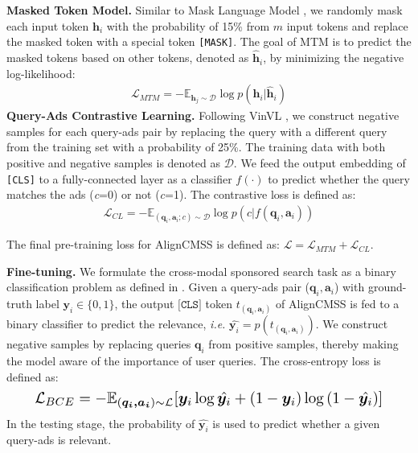 \documentclass[letterpaper]{article} \usepackage{aaai24}  \usepackage{times}  \usepackage{helvet}  \usepackage{courier}  \usepackage[hyphens]{url}  \usepackage{graphicx} \urlstyle{rm} \def\UrlFont{\rm}  \usepackage{natbib}  \usepackage{caption} \frenchspacing  \setlength{\pdfpagewidth}{8.5in}  \setlength{\pdfpageheight}{11in}
\begin{document}
\noindent\textbf{Masked Token Model.} Similar to Mask Language Model \cite{devlin2019bert}, we randomly mask each input token $\boldsymbol{h}_i$ with the probability of 15\% from $m$ input tokens and replace the masked token with a special token \texttt{[MASK]}. 
The goal of MTM is to predict the masked tokens based on other tokens, denoted as $\hat{\boldsymbol{h}}_i$, by minimizing the negative log-likelihood:
\begin{equation}
\begin{aligned}
\mathcal{L}_{MTM} = -\mathbb{E}_{ \boldsymbol{h}_j\sim{\mathcal{D}}}\log{p(\boldsymbol{h}_i|{{\hat{\boldsymbol{h}}_i}})}
\label{f:6}
\end{aligned}
\end{equation}
\noindent\textbf{Query-Ads Contrastive Learning.} Following VinVL \cite{zhang2021vinvl}, we construct negative samples for each query-ads pair by replacing the query with a different query from the training set with a probability of 25\%. The training data with both positive and negative samples is denoted as $\mathcal{D}$. We feed the output embedding of \texttt{[CLS]} to a fully-connected layer as a classifier $f(\cdot)$ to predict whether the query matches the ads (\textit{c}=0) or not (\textit{c}=1). The contrastive loss is defined as:
\begin{equation}
\begin{aligned}
\mathcal{L}_{CL} = -\mathbb{E}_{(\boldsymbol{q}_i,\boldsymbol{a}_i;c)\sim{\mathcal{D}}}\log{p(c|f(\boldsymbol{q}_i, \boldsymbol{a}_i))}
\label{f:7}
\end{aligned}
\end{equation}

The final pre-training loss for AlignCMSS is defined as: $\mathcal{L} = \mathcal{L}_{MTM} + \mathcal{L}_{CL}$.

\noindent\textbf{Fine-tuning.}  We formulate the cross-modal sponsored search task as a binary classification problem as defined in \cite{DBLP:journals/corr/abs-2001-07966}. Given a query-ads pair ($\boldsymbol{q}_i, \boldsymbol{a}_i$) with ground-truth label $\boldsymbol{y}_i\in{\{0, 1\}}$, the output $\texttt{[CLS]}$ token $t_{(\boldsymbol{q}_i, \boldsymbol{a}_i)}$ of AlignCMSS is fed to a binary classifier to predict the relevance, \emph{i.e.} $\hat{\boldsymbol{y}_i} = p(t_{(\boldsymbol{q}_i, \boldsymbol{a}_i)})$. We construct negative samples by replacing queries $\boldsymbol{q}_i$ from positive samples, thereby making the model aware of the importance of user queries. The cross-entropy loss is defined as:
\begin{equation}
\begin{aligned}
\resizebox{0.9\hsize}{!}{$\mathcal{L}_{BCE} = -\mathbb{E}_{(\boldsymbol{q_i, a_i})\sim{\mathcal{L}}}[\boldsymbol{y}_i\log{\hat{\boldsymbol{y}_i}} + (1-\boldsymbol{y}_i)\log{(1-\hat{\boldsymbol{y}_i} )}]$}
\label{f:9}
\end{aligned}
\end{equation}
In the testing stage, the probability of $\hat{\boldsymbol{y}_i}$ is used to predict whether a given query-ads is relevant.
\end{document}
